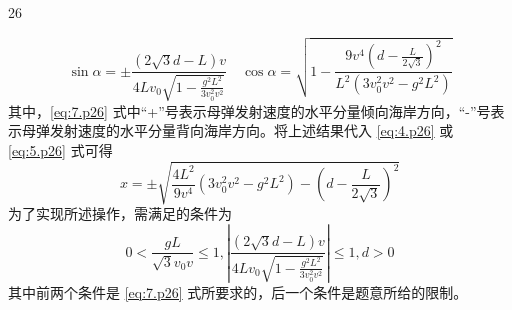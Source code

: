 \begin{solution}{26}
\begin{subproblem}[参考解答（一）]
\begin{equation}
    \end{equation}
    \begin{equation}
      \sin \alpha = \pm \frac{(2 \sqrt{3} d - L) v}{4 L v_{0} \sqrt{1 - \frac{g^{2} L^{2}}{3 v_{0}^{2} v^{2}}}} \quad \cos \alpha = \sqrt{1 - \frac{9 v^{4} \left(d - \frac{L}{2 \sqrt{3}}\right)^{2}}{L^{2} (3 v_{0}^{2} v^{2} - g^{2} L^{2})}}
      \label{eq:7.p26}
    \end{equation}
    其中，\eqref{eq:7.p26} 式中“+”号表示母弹发射速度的水平分量倾向海岸方向，“-”号表示母弹发射速度的水平分量背向海岸方向。将上述结果代入 \eqref{eq:4.p26} 或 \eqref{eq:5.p26} 式可得
    \begin{equation}
      x = \pm \sqrt{\frac{4 L^{2}}{9 v^{4}} (3 v_{0}^{2} v^{2} - g^{2} L^{2}) - (d - \frac{L}{2 \sqrt{3}})^{2}}
      \label{eq:8.p26}
    \end{equation}
    为了实现所述操作，需满足的条件为
    \begin{equation}
      0 < \frac{g L}{\sqrt{3} v_{0} v} \leq 1, \left| \frac{(2 \sqrt{3} d - L) v}{4 L v_{0} \sqrt{1 - \frac{g^{2} L^{2}}{3 v_{0}^{2} v^{2}}}} \right| \leq 1, d > 0
      \label{eq:9.p26}
    \end{equation}
    其中前两个条件是 \eqref{eq:7.p26} 式所要求的，后一个条件是题意所给的限制。


\end{subproblem}
\end{solution}
